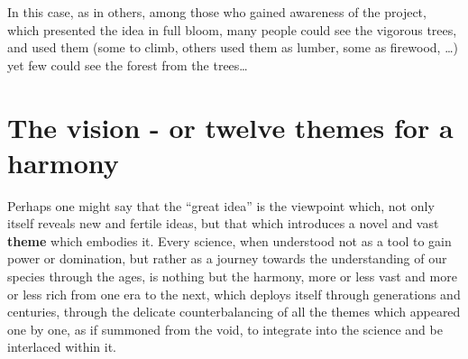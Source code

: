In this case, as in others, 
among those who gained awareness of the project, 
which presented the idea in full bloom,
many people could see the vigorous trees, and used them 
(some to climb, others used them as lumber, some as firewood, \ldots)
yet few could see the forest from the trees\ldots

\section{The vision - or twelve themes for a harmony}

Perhaps one might say that the
``great idea'' is the viewpoint which, not only itself reveals new and fertile ideas, 
but that which introduces a novel and vast \textbf{theme} which embodies it.
Every science, when understood not as a tool to gain power or domination, but rather as a
journey towards the understanding of our species through the ages,
is nothing but the harmony, more or less vast and more or less rich from one era to the
next, which deploys itself through generations and centuries, through the delicate
counterbalancing of all the themes which appeared one by one, as if summoned from the
void, to integrate into the science and be interlaced within it.

